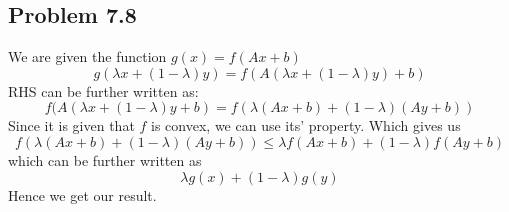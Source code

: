 \documentclass[letterpaper,12pt]{article}
\theoremstyle{definition}
\begin{document}
\subsection*{Problem 7.8}
We are given the function $ g(x) =  f(Ax+b) $ 
\begin{equation*}
    g(\lambda x + (1-\lambda) y) =  f(A(\lambda x + (1-\lambda)y) + b)
\end{equation*}
RHS can be further written as:
\begin{equation*}
     f(A(\lambda x + (1-\lambda)y + b) = f(\lambda(Ax+b) + (1-\lambda)(Ay+b))
\end{equation*}
Since it is given that $f$ is convex, we can use its' property. Which gives us 
\begin{equation*}
    f(\lambda(Ax+b) + (1-\lambda)(Ay+b)) \leq  \lambda f(Ax+b) + (1-\lambda)f(Ay+b)
\end{equation*}
which can be further written as
\begin{equation*}
    \lambda g(x) + (1-\lambda)g(y)
\end{equation*}
Hence we get our result.
\end{document}
